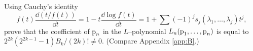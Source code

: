 \documentclass[../main]{subfiles}
\begin{document}
\begin{problem}\label{prob:19.C}
Using Cauchy's identity \[f(t) \frac {\dd(t/f(t))} {\dd t} = 1 - t \frac {\dd \log f(t)} {\dd t} = 1 + \sum (-1)^j s_j(\lambda_1, \ldots, \lambda_j) t^j,\] prove that the coefficient of $\operatorname{p}_n$ in the $L$--polynomial $L_n(\operatorname{p}_1, \ldots, \operatorname{p}_n)$ is equal to $2^{2k}(2^{2k - 1} - 1)B_k/(2k)! \ne 0$. (Compare Appendix \ref{app:B}.)
\end{problem}
\end{document}
